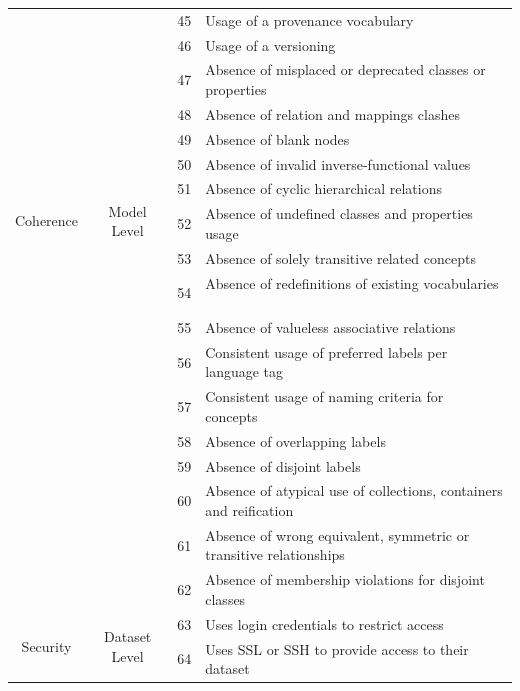 \documentclass[onecolumn, crcready]{../../Util/LaTEX/iosart2c}
\begin{document}
\begin{center}
{\begin{longtable}[h]{|c|c|c|l|}
\cline{3-4}
 &  & 45 & Usage of a provenance vocabulary\tabularnewline
 \cline{3-4}
 &  & 46 & Usage of a versioning\tabularnewline
\hline
\hline
\multirow{10}{*}{Coherence} & \multirow{10}{*}{Model Level} & 47 & Absence of misplaced or deprecated classes or properties ~\cite{Hogan:LDOW:10}\tabularnewline
\cline{3-4}
 &  & 48 & Absence of relation and mappings clashes ~\cite{Suominen:IKEM:12}\tabularnewline
\cline{3-4}
 &  & 49 & Absence of blank nodes~\cite{Hogan:WebSemJorunal:12}\tabularnewline
\cline{3-4}
 &  & 50 & Absence of invalid inverse-functional values~\cite{Hogan:LDOW:10}\tabularnewline
\cline{3-4}
 &  & 51 & Absence of cyclic hierarchical relations~\cite{Dagobert:DL:02,Suominen:IKEM:12,Mader:TBDL:12}\tabularnewline
\cline{3-4}
 &  & 52 & Absence of undefined classes and properties usage~\cite{Hogan:LDOW:10}\tabularnewline
\cline{3-4}
 &  & 53 & Absence of solely transitive related concepts~\cite{Mader:TBDL:12}\tabularnewline
\cline{3-4}
 &  & 54 & Absence of redefinitions of existing vocabularies ~\cite{Hogan:LDOW:10}\tabularnewline
\cline{3-4}
 &  & 55 & Absence of valueless associative relations ~\cite{Mader:TBDL:12}\tabularnewline
\hline
\hline
\multirow{7}{*}{Consistency}
 & \multirow{7}{*}{Model Level}
& 56 & Consistent usage of preferred labels per language tag~\cite{Isaac:W3C:09,Mader:TBDL:12}\tabularnewline
 \cline{3-4}
 & & 57 & Consistent usage of naming criteria for concepts~\cite{Maria:KEOD:13}\tabularnewline
\cline{3-4}
 &  & 58 & Absence of overlapping labels\tabularnewline
\cline{3-4}
 &  & 59 & Absence of disjoint labels~\cite{Mader:TBDL:12}\tabularnewline
\cline{3-4}
 & & 60 & Absence of atypical use of collections, containers and reification~\cite{Hogan:LDOW:10}\tabularnewline
\cline{3-4}
 &  & 61 & Absence of wrong equivalent, symmetric or transitive relationships~\cite{Maria:KEOD:13}\tabularnewline
\cline{3-4}
 &  & 62 & Absence of membership violations for disjoint classes~\cite{Hogan:LDOW:10}\tabularnewline
\hline
\hline
\multirow{2}{*}{Security} & \multirow{2}{*}{Dataset Level} & 63 & Uses login credentials to restrict access~\cite{Zaveri:SemWebJorunal:12}\tabularnewline
\cline{3-4}
 &  & 64 & Uses SSL or SSH to provide access to their dataset~\cite{Zaveri:SemWebJorunal:12}\tabularnewline
\hline
\end{longtable}
}
\end{center}
\end{document}
